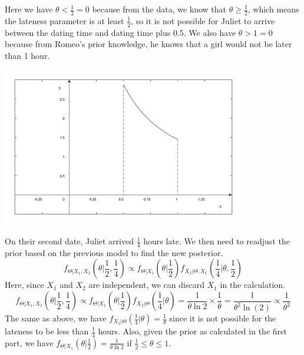 \begin{eg}
  \begin{minipage}{0.5\textwidth}
    Here we have \(\theta < \frac{1}{2} = 0\) because from the data, we know that \(\theta \geq \frac{1}{2}\), which means the lateness parameter is at least \(\frac{1}{2}\), so it is not possible for Juliet to arrive between the dating time and dating time plus 0.5. We also have \(\theta > 1 = 0\) because from Romeo's prior knowledge, he knows that a girl would not be later than 1 hour.
  \end{minipage}
  \begin{minipage}{0.5\textwidth}
    \centering
    \includegraphics[width=0.8\textwidth]{Figures/Romeo_model.pdf}
  \end{minipage}

  On their second date, Juliet arrived \(\frac{1}{4}\) hours late. We then need to readjust the prior based on the previous model to find the new posterior.
  \[
    f_{\Theta \vert X_1, X_2} \left(\theta \Big| \dfrac{1}{2}, \dfrac{1}{4}\right) \propto f_{\Theta \vert X_1} \left(\theta \Big| \dfrac{1}{2}\right) f_{X_2 \vert \Theta, X_1}\left(\dfrac{1}{4} \Big| \theta, \frac{1}{2}\right)
  \]
  Here, since \(X_1\) and \(X_2\) are independent, we can discard \(X_1\) in the calculation.
  \[
    f_{\Theta \vert X_1, X_2} \left(\theta \Big| \dfrac{1}{2}, \dfrac{1}{4}\right) \propto f_{\Theta \vert X_1} \left(\theta \Big| \dfrac{1}{2}\right) f_{X_2 \vert \Theta}\left(\dfrac{1}{4} \Big| \theta\right) = \dfrac{1}{\theta \ln 2} \times \dfrac{1}{\theta} = \dfrac{1}{\theta^{2} \ln{(2)}} \propto \dfrac{1}{\theta^2}
  \]
  The same as above, we have \(f_{X_2 \vert \Theta} (\frac{1}{4} \vert \theta) = \frac{1}{\theta}\) since it is not possible for the lateness to be less than \(\frac{1}{4}\) hours. Also, given the prior as calculated in the first part, we have \(f_{\Theta \vert X_1} (\theta \vert \frac{1}{2}) = \frac{1}{\theta \ln 2}\) if \(\frac{1}{2} \leq \theta \leq 1\).


\end{eg}
